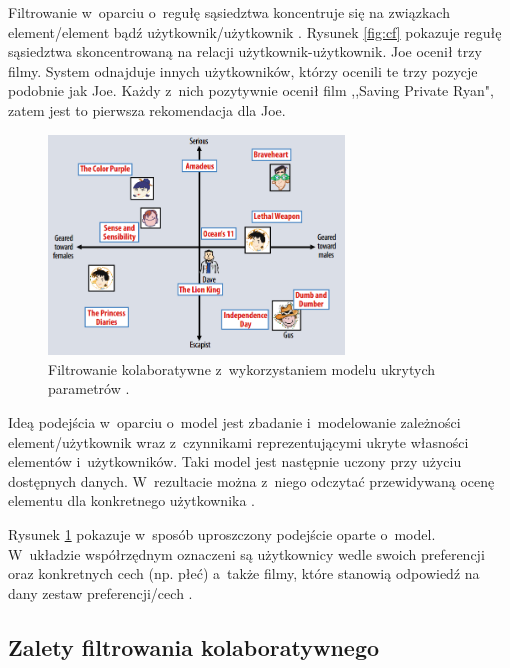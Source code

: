 \documentclass[twoside]{iisthesis}
\begin{document}
	  Filtrowanie w~oparciu o~regułę sąsiedztwa koncentruje się na związkach element\-/element bądź użytkownik\-/użytkownik \cite{id:AdvancesInCollaborativeFiltering}.
	  Rysunek \ref{fig:cf} pokazuje regułę sąsiedztwa skoncentrowaną na relacji użytkownik-użytkownik. Joe ocenił trzy filmy. System odnajduje innych użytkowników, którzy ocenili te trzy pozycje podobnie jak Joe. Każdy z~nich pozytywnie ocenił film ,,Saving Private Ryan", zatem jest to pierwsza rekomendacja dla Joe. 
	  
	  \begin{figure}[!ht] 
	  	\centering
	  	\includegraphics[width=0.7\textwidth]{cf2}
	  	\caption{Filtrowanie kolaboratywne z~wykorzystaniem modelu ukrytych parametrów \protect\cite{koren2009matrix}.}
	  	\label{fig:cf2}
	  \end{figure}
	  
	  Ideą podejścia w~oparciu o~model jest zbadanie i~modelowanie zależności element\-/użytkownik wraz z~czynnikami reprezentującymi ukryte własności elementów i~użytkowników. Taki model jest następnie uczony przy użyciu dostępnych danych. W~rezultacie można z~niego odczytać przewidywaną ocenę elementu dla konkretnego użytkownika \cite{id:ComprehensiveSurveyOfNeighborhoodBasedRecommendationMethods, id:AdvancesInCollaborativeFiltering}.
	  
	  Rysunek \ref{fig:cf2} pokazuje w~sposób uproszczony podejście oparte o~model. W~układzie współrzędnym oznaczeni są użytkownicy wedle swoich preferencji oraz konkretnych cech (np. płeć) a~także filmy, które stanowią odpowiedź na dany zestaw preferencji/cech \cite{koren2009matrix}. 
	  
	  \subsection{Zalety filtrowania kolaboratywnego}
	  
\end{document}
